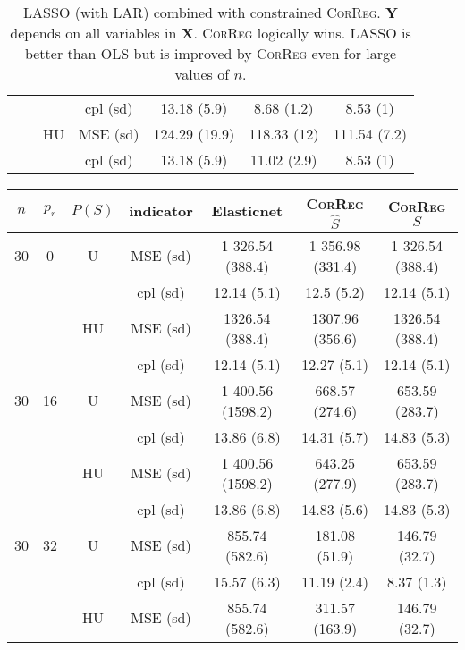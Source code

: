 \documentclass[11pt,a4paper]{article}
\begin{document}
\begin{table}[h!]
\begin{tabular}{|c|c|c|c|c|c|c|}
& & & cpl (sd) & 13.18 (5.9) & 8.68 (1.2) & 8.53 (1) \\
 &  &HU & MSE (sd) & 124.29 (19.9) & 118.33 (12) & 111.54 (7.2) \\
& & & cpl (sd) & 13.18 (5.9) & 11.02 (2.9) & 8.53 (1) \\
\hline
\end{tabular} 
\caption{LASSO (with LAR) combined with constrained \textsc{CorReg}. $\boldsymbol{Y}$  depends on all variables in $\boldsymbol{X}$. \textsc{CorReg} logically wins. LASSO is better than OLS but is improved by \textsc{CorReg} even for large values of $n$.}\label{YXlinLASSO}
\end{table}

\begin{table}[h!]
\centering
\begin{tabular}{|c|c|c|c|c|c|c|}
\hline 
$n$ & $p_r$&  $P(S)$&indicator &Elasticnet  &    \textsc{CorReg} $\hat S$& \textsc{CorReg} $S$\\ 
\hline %
30 & 0 & U&MSE (sd) & 1 326.54 (388.4) & 1 356.98 (331.4) & 1 326.54 (388.4) \\
& & & cpl (sd) & 12.14 (5.1) & 12.5 (5.2) & 12.14 (5.1) \\
 &  &HU & MSE (sd) & 1326.54 (388.4) & 1307.96 (356.6) & 1326.54 (388.4) \\
& & & cpl (sd) & 12.14 (5.1) & 12.27 (5.1) & 12.14 (5.1) \\
\hline %
30 & 16 & U&MSE (sd) & 1 400.56 (1598.2) & 668.57 (274.6) & 653.59 (283.7) \\
& & & cpl (sd) & 13.86 (6.8) & 14.31 (5.7) & 14.83 (5.3) \\
 &  &HU &MSE (sd) & 1 400.56 (1598.2) & 643.25 (277.9) & 653.59 (283.7) \\
& & & cpl (sd) & 13.86 (6.8) & 14.83 (5.6) & 14.83 (5.3) \\
\hline %
30 & 32 & U & MSE (sd) & 855.74 (582.6) & 181.08 (51.9) & 146.79 (32.7) \\
& & & cpl (sd) & 15.57 (6.3) & 11.19 (2.4) & 8.37 (1.3) \\
 &  & HU & MSE (sd) & 855.74 (582.6) & 311.57 (163.9) & 146.79 (32.7) \\

\end{tabular}
\end{table}
\end{document}
